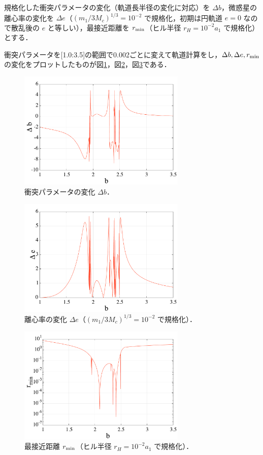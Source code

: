 \documentclass[11pt,a4paper,oneside,onecolumn]{jreport}
\begin{document}
規格化した衝突パラメータの変化（軌道長半径の変化に対応）を $\Delta b$，微惑星の離心率の変化を $\Delta e$（$(m_1 / 3 M_c)^{1/3} = 10^{-2}$ で規格化，初期は円軌道 $e = 0$ なので散乱後の $e$ と等しい），最接近距離を $r_{\rm min}$（ヒル半径 $r_H = 10^{-2} a_1$ で規格化）とする．

衝突パラメータを[1.0:3.5]の範囲で0.002ごとに変えて軌道計算をし，$\Delta b, \Delta e, r_{\rm min}$ の変化をプロットしたものが図\ref{fig:delta_b}，図\ref{fig:delta_e}，図\ref{fig:r_min}である．

\begin{figure}[H]
\centering
\includegraphics[width=8cm]{./image/planetesimal_delta_b.pdf}
\caption{衝突パラメータの変化 $\Delta b$．\label{fig:delta_b}}
\end{figure}

\begin{figure}[H]
\centering
\includegraphics[width=8cm]{./image/planetesimal_delta_e.pdf}
\caption{離心率の変化 $\Delta e$（$(m_1 / 3 M_c)^{1/3} = 10^{-2}$ で規格化）．\label{fig:delta_e}}
\end{figure}

\begin{figure}[H]
\centering
\includegraphics[width=8cm]{./image/planetesimal_r_min.pdf}
\caption{最接近距離 $r_{\rm min}$（ヒル半径 $r_H = 10^{-2} a_1$ で規格化）．\label{fig:r_min}}
\end{figure}
\end{document}
